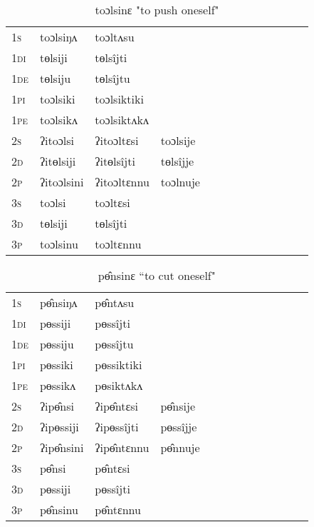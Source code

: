 \documentclass[oldfontcommands,oneside,a4paper,11pt]{article}
\begin{document}
\begin{table}[H]
\label{ol.vr} \centering 
\caption{toɔlsinɛ  "to push oneself"  }
\begin{tabular}{l|l|l|l|l|l|l|l|l|l|l|l|l}  \toprule
\textsc{1s} &toɔlsiŋʌ &toɔltʌsu \\ 
\textsc{1di} &tɵlsiji &tɵlsîjti   \\
\textsc{1de} &tɵlsiju &tɵlsîjtu   \\ 
\textsc{1pi} &toɔlsiki &toɔlsiktiki   \\ 
\textsc{1pe} &toɔlsikʌ &toɔlsiktʌkʌ   \\ 
\textsc{2s} & ʔitoɔlsi & ʔitoɔltɛsi &toɔlsije  \\ 
\textsc{2d} & ʔitɵlsiji & ʔitɵlsîjti &tɵlsîjje    \\
\textsc{2p} & ʔitoɔlsini  & ʔitoɔltɛnnu &toɔlnuje  \\ 
\textsc{3s} & toɔlsi & toɔltɛsi   \\ 
\textsc{3d} & tɵlsiji & tɵlsîjti   \\ 
\textsc{3p} & toɔlsinu  & toɔltɛnnu \\ 
\bottomrule
\end{tabular}
\end{table}


\begin{table}[H]
\label{o.vr} \centering 
\caption{ pɵ̂nsinɛ  ``to cut oneself"  }
\begin{tabular}{l|l|l|l|l|l|l|l|l|l|l|l|l}  \toprule
\textsc{1s} &pɵ̂nsiŋʌ &pɵ̂ntʌsu \\ 
\textsc{1di} &pɵssiji &pɵssîjti   \\
\textsc{1de} &pɵssiju &pɵssîjtu   \\ 
\textsc{1pi} &pɵssiki &pɵssiktiki   \\ 
\textsc{1pe} &pɵssikʌ &pɵsiktʌkʌ   \\ 
\textsc{2s} & ʔipɵ̂nsi & ʔipɵ̂ntɛsi &pɵ̂nsije  \\ 
\textsc{2d} & ʔipɵssiji & ʔipɵssîjti &pɵssîjje    \\
\textsc{2p} & ʔipɵ̂nsini  & ʔipɵ̂ntɛnnu &pɵ̂nnuje  \\ 
\textsc{3s} & pɵ̂nsi & pɵ̂ntɛsi   \\ 
\textsc{3d} & pɵssiji & pɵssîjti   \\ 
\textsc{3p} & pɵ̂nsinu  & pɵ̂ntɛnnu \\ 
\bottomrule
\end{tabular}
\end{table}

 
\end{document}
